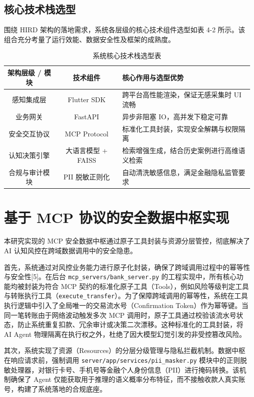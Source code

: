\documentclass{xduugthesis}
\begin{document}
\subsection{核心技术栈选型}

围绕 HIRD 架构的落地需求，系统各层级的核心技术组件选型如表 4-2 所示。该组合充分考量了运行效能、数据安全性及框架的成熟度。

\begin{table}[H]
    \centering
    \caption{系统核心技术栈选型表}
    \label{tab:tech-stack}
    \begin{tabular}{|c|c|p{7cm}|}
        \hline
        架构层级 / 模块 & 技术组件 & 核心作用与选型优势 \\
        \hline
        感知集成层  & Flutter SDK & 跨平台高性能渲染，保证无感采集时 UI 流畅 \\
        \hline
        业务网关  & FastAPI & 异步非阻塞 IO，高并发下稳定可靠 \\
        \hline
        安全交互协议 & MCP Protocol & 标准化工具封装，实现安全解耦与权限隔离 \\
        \hline
        认知决策引擎 & 大语言模型 + FAISS & 检索增强生成，结合历史案例进行高维语义检索 \\
        \hline
        合规与审计模块 & PII 脱敏正则化 & 自动清洗敏感信息，满足金融隐私监管要求 \\
        \hline
    \end{tabular}
\end{table}

\section{基于 MCP 协议的安全数据中枢实现}

本研究实现的 MCP 安全数据中枢通过原子工具封装与资源分层管控，彻底解决了 AI 认知风控在跨域数据调用中的安全隐患。

首先，系统通过对风控业务能力进行原子化封装，确保了跨域调用过程中的幂等性与安全性[5]。在后台 \texttt{mcp\_servers/bank\_server.py} 的工程实现中，所有核心功能均被封装为符合 MCP 契约的标准化原子工具（Tools），例如风险等级判定工具与转账执行工具（\texttt{execute\_transfer}）。为了保障跨域调用的幂等性，系统在工具执行逻辑中引入了全局唯一的交易流水号（Confirmation Token）作为幂等键。当同一笔转账由于网络波动触发多次 MCP 调用时，原子工具通过校验该流水号状态，防止系统重复扣款、冗余审计或决策二次漂移。这种标准化的工具封装，将 AI Agent 物理隔离在执行权之外，杜绝了因大模型幻觉引发的非受控篡改风险。

其次，系统实现了资源（Resources）的分层分级管理与隐私拦截机制。数据中枢在响应请求前，强制调用 \texttt{server/app/services/pii\_masker.py} 模块中的正则脱敏处理器，对银行卡号、手机号等金融个人身份信息（PII）进行掩码转换。该机制确保了 Agent 仅能获取用于推理的语义概率分布特征，而不接触收款人真实账号，构建了系统落地的合规底座。
\end{document}
